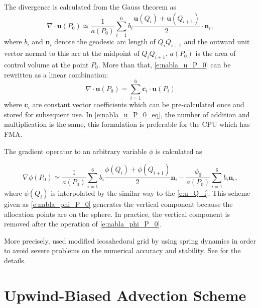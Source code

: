 The divergence is calculated from the Gauss theorem as
%
\begin{equation}
 \nabla \cdot \bm{u}(P_0) \simeq \frac{1}{a(P_0)} %
  \sum^{6}_{i=1} b_i \frac{\bm{u}(Q_i)+\bm{u} (Q_{i+1})}{2} \cdot
  \bm{n}_i,\label{e:nabla_u_P_0}
\end{equation}
%
where $b_i$ and $\bm{n}_i$ denote the geodesic arc length of
$Q_i Q_{i+1}$ and the outward unit vector normal to this arc at the
midpoint of $Q_i Q_{i+1}$.
%
$a(P_0)$ is the area of control volume at the point $P_0$.
%
More than that, \autoref{e:nabla_u_P_0} can be rewritten as a
linear combination:
%
\begin{equation}
 \nabla \cdot \bm{u} (P_0) = \sum^{6}_{i=1} \bm{c}_i \cdot \bm{u}(P_i)\label{e:nabla_u_P_0_eq}
\end{equation}
%
where $\bm{c}_i$ are constant vector coefficients which can be
pre-calculated once and stored for subsequent use.
%
In \autoref{e:nabla_u_P_0_eq}, the number of addition and
multiplication is the same, this formulation is preferable for the CPU
which has FMA.



The gradient operator to an arbitrary variable $\phi$ is calculated as

\begin{equation}
 \nabla \phi(P_0) \simeq
  \frac{1}{a(P_0)}
  \sum^{6}_{i=1} b_i \frac{\phi(Q_i) + \phi(Q_{i+1})}{2} \bm{n}_i
  - \frac{\phi_0}{a(P_0)} \sum^{6}_{i=1} b_i \bm{n}_i,\label{e:nabla_phi_P_0}
\end{equation}
%
where $\phi(Q_i)$ is interpolated by the similar way to the 
\autoref{e:u_Q_i}.
%
This scheme given as \autoref{e:nabla_phi_P_0} generates the
vertical component because the allocation points are on the sphere.
%
In practice, the vertical component is removed after the operation of
\autoref{e:nabla_phi_P_0}.


More precisely, \NICAM used modified icosahedoral grid by using spring dynamics in order to avoid
severe problems on the numerical accuracy and stability.
See \cite{Tomita:2001id} for the details.
%


\section{Upwind-Biased Advection Scheme}\label{s:upwind_scheme}

